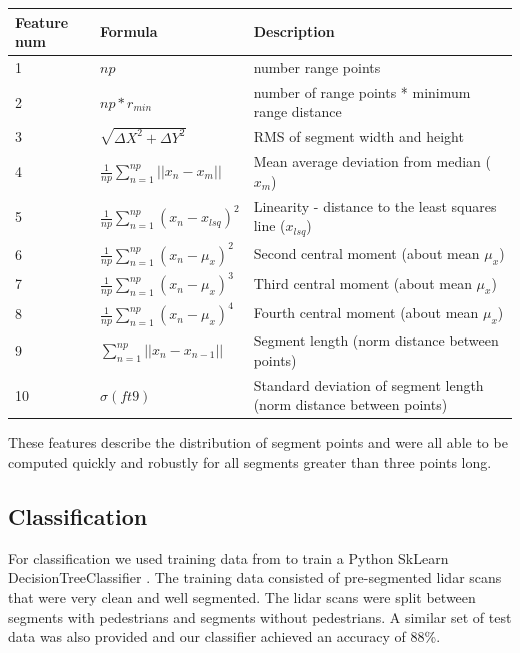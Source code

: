 \documentclass[10pt,twocolumn,letterpaper]{article}
\begin{document}
  \renewcommand{\arraystretch}{1.5}
  \begin{center}
    \begin{tabular}{ | p{1cm} | l | p{2.9cm} |}
      \hline
      Feature num & Formula & Description \\ \hline
      1 & $ np $ & number range points \\ \hline
      2 & $np*r_{min}$ & number of range points * minimum range distance \\ \hline
      3 & $\sqrt{ \Delta X^2 + \Delta Y^2} $ & RMS of segment width and height
      \\ \hline
      4 & $ \frac{1}{np}\sum_{n=1}^{np} || x_n - x_m|| $ & Mean average deviation
      from median ($x_m$) \\ \hline
      5 & $ \frac{1}{np}\sum_{n=1}^{np} (x_n - x_{lsq})^2 $ & Linearity -
      distance to the least squares line ($ x_{lsq}$) \\ \hline
      6 & $ \frac{1}{np}\sum_{n=1}^{np} (x_n - \mu_x)^2 $ & Second central
      moment (about mean $\mu_x$) \\ \hline
      7 & $ \frac{1}{np}\sum_{n=1}^{np} (x_n - \mu_x)^3 $ & Third central
      moment (about mean $\mu_x$) \\ \hline
      8 & $ \frac{1}{np}\sum_{n=1}^{np} (x_n - \mu_x)^4 $ & Fourth central
      moment (about mean $\mu_x$) \\ \hline
      9 & $ \sum_{n=1}^{np} ||x_n - x_{n-1}|| $ & Segment length (norm distance
      between points) \\ \hline
      10 & $ \sigma(ft9) $ & Standard deviation of
      segment length (norm distance between points) \\ \hline
    \end{tabular}
  \end{center}

  These features describe the distribution of segment points and were all able to
  be computed quickly and robustly for all segments greater than three points long.

  \subsection{Classification}
  For classification we used training data from \cite{dataset} to train a Python
  SkLearn DecisionTreeClassifier \cite{sklearn}. The training data consisted of
  pre-segmented lidar scans that were very clean and well segmented. The lidar
  scans were split between segments with pedestrians and segments without
  pedestrians. A similar set of test data was also provided and our classifier
  achieved an accuracy of 88\%.
\end{document}
